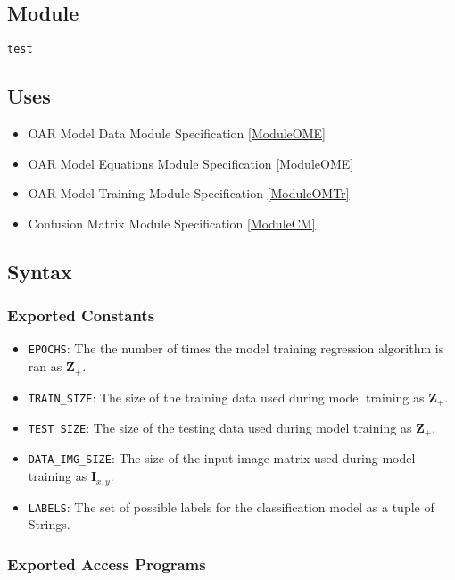 \documentclass[12pt, titlepage]{article}
\def\code#1{\texttt{#1}}
\begin{document}
\subsection{Module}

\code{test}

\subsection{Uses}

\begin{itemize}
  \item OAR Model Data Module Specification \ref{ModuleOME}
  \item OAR Model Equations Module Specification \ref{ModuleOME}
  \item OAR Model Training Module Specification \ref{ModuleOMTr}
  \item Confusion Matrix Module Specification \ref{ModuleCM}
\end{itemize}

\subsection{Syntax}

\subsubsection{Exported Constants}

\begin{itemize}
\item \code{EPOCHS}: The the number of times the model training regression algorithm is ran as $\mathbf{Z}_{+}$.
\item \code{TRAIN\_SIZE}: The size of the training data used during model training as $\mathbf{Z}_{+}$.
\item \code{TEST\_SIZE}: The size of the testing data used during model training as $\mathbf{Z}_{+}$.
\item \code{DATA\_IMG\_SIZE}: The size of the input image matrix used during model training as $\mathbf{I}_{x,y}$.
\item \code{LABELS}: The set of possible labels for the classification model as a tuple of Strings.
\end{itemize}

\subsubsection{Exported Access Programs}
\end{document}
